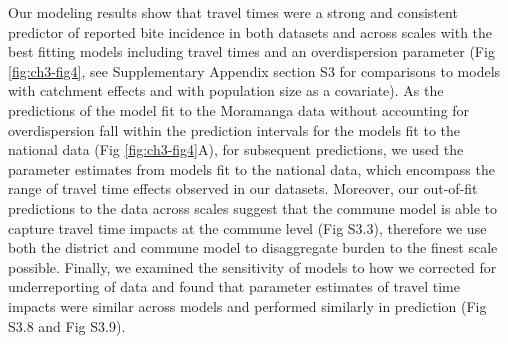 \documentclass[
  oneside]{book}
\begin{document}
Our modeling results show that travel times were a strong and consistent
predictor of reported bite incidence in both datasets and across scales
with the best fitting models including travel times and an
overdispersion parameter (Fig \ref{fig:ch3-fig4}, see Supplementary Appendix section S3
for comparisons to models with catchment effects and with population
size as a covariate). As the predictions of the model fit to the
Moramanga data without accounting for overdispersion fall within the
prediction intervals for the models fit to the national data (Fig \ref{fig:ch3-fig4}A),
for subsequent predictions, we used the parameter estimates from models
fit to the national data, which encompass the range of travel time
effects observed in our datasets. Moreover, our out-of-fit predictions
to the data across scales suggest that the commune model is able to
capture travel time impacts at the commune level (Fig S3.3), therefore
we use both the district and commune model to disaggregate burden to the
finest scale possible. Finally, we examined the sensitivity of models to
how we corrected for underreporting of data and found that parameter
estimates of travel time impacts were similar across models and
performed similarly in prediction (Fig S3.8 and Fig S3.9).
\end{document}
